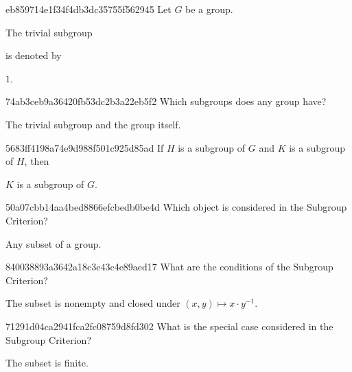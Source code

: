 \begin{note}{eb859714e1f34f4db3dc35755f562945}
    Let \({ G }\) be a group.
    \begin{icloze}{2}The trivial subgroup\end{icloze} is denoted by \begin{icloze}{1}\({ 1 }\).\end{icloze}
\end{note}

\begin{note}{74ab3ceb9a36420fb53dc2b3a22eb5f2}
    Which subgroups does any group have?

    \begin{cloze}{1}
        The trivial subgroup and the group itself.
    \end{cloze}
\end{note}

\begin{note}{5683ff4198a74e9d988f501c925d85ad}
    If \({ H }\) is a subgroup of \({ G }\) and \({ K }\) is a subgroup of \({ H }\), then \begin{icloze}{1}\({ K }\) is a subgroup of \({ G }\).\end{icloze}
\end{note}

\begin{note}{50a07cbb14aa4bed8866efcbedb0be4d}
    Which object is considered in the Subgroup Criterion?

    \begin{cloze}{1}
        Any subset of a group.
    \end{cloze}
\end{note}

\begin{note}{840038893a3642a18c3e43c4e89aed17}
    What are the conditions of the Subgroup Criterion?

    \begin{cloze}{1}
        The subset is nonempty and closed under \({ (x, y) \mapsto x \cdot y^{-1} }\).
    \end{cloze}
\end{note}

\begin{note}{71291d04ca2941fca2fc08759d8fd302}
    What is the special case considered in the Subgroup Criterion?

    \begin{cloze}{1}
        The subset is finite.
    \end{cloze}
\end{note}

